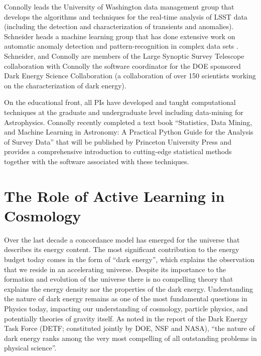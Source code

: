 \documentclass[prd,nofootbib,floatfix,11pt,tightenlines,nofootinbib]{revtex4}
\begin{document}
Connolly leads the University of Washington data management group that
develops the algorithms and techniques for the real-time analysis of
LSST data (including the detection and characterization of
transients and anomalies).  Schneider heads a machine learning group
that has done extensive work on automatic anomaly detection and
pattern-recognition in complex data sets
\cite{Xiong2011gad,poczos12CVPR}.  Schneider, and Connolly are members
of the Large Synoptic Survey Telescope collaboration with Connolly the
software coordinator for the DOE sponsored Dark Energy Science
Collaboration (a collaboration of over 150 scientists working on the
characterization of dark energy).


On the educational front, all PIs have developed and taught computational techniques at the
graduate and undergraduate level including data-mining for
Astrophysics. Connolly recently completed a text book ``Statistics,
Data Mining, and Machine Learning in Astronomy: A Practical Python
Guide for the Analysis of Survey Data'' that will be published by
Princeton University Press and provides a comprehensive introduction
to cutting-edge statistical methods together with the software
associated with these techniques. 
%

\section{The Role of Active Learning in Cosmology}

Over the last decade a concordance model has emerged for the universe
that describes its energy content. The most significant contribution
to the energy budget today comes in the form of ``dark energy'', which
explains the observation that we reside in an accelerating
universe. Despite its importance to the formation and evolution of the
universe there is no compelling theory that explains the energy
density nor the properties of the dark energy. Understanding the
nature of dark energy remains as one of the most fundamental questions
in Physics today, impacting our understanding of cosmology, particle
physics, and potentially theories of gravity itself.  As noted in the 
report of the Dark Energy Task Force (DETF; constituted jointly by
DOE, NSF and NASA), ``the nature of dark energy ranks among the very
most compelling of all outstanding problems in physical science''.
\end{document}
